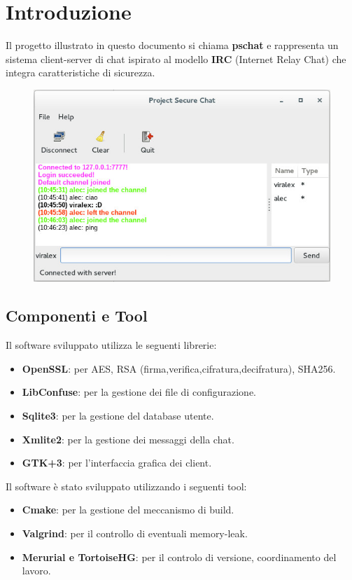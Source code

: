 \documentclass[a4paper,titlepage]{article}
\begin{document}
\section{Introduzione}  \thispagestyle{plain}
Il progetto illustrato in questo documento si chiama \textbf{pschat} e rappresenta un sistema client-server di chat ispirato al modello \textbf{IRC} (Internet Relay Chat) che integra caratteristiche di sicurezza.\\
\begin{figure}[H]
  \centering \includegraphics[scale=1.0]{img/psc_orig.jpg}
\end{figure}
\subsection{Componenti e Tool}
Il software sviluppato utilizza le seguenti librerie:
\begin{itemize}
\item \textbf{OpenSSL}: per AES, RSA (firma,verifica,cifratura,decifratura), SHA256.
\item \textbf{LibConfuse}: per la gestione dei file di configurazione.
\item \textbf{Sqlite3}: per la gestione del database utente.
\item \textbf{Xmlite2}: per la gestione dei messaggi della chat.
\item \textbf{GTK+3}: per l'interfaccia grafica dei client.
\end{itemize}

Il software è stato sviluppato utilizzando i seguenti tool:
\begin{itemize}
\item \textbf{Cmake}: per la gestione del meccanismo di build.
\item \textbf{Valgrind}: per il controllo di eventuali memory-leak.
\item \textbf{Merurial e TortoiseHG}: per il controlo di versione, coordinamento del lavoro.
\end{itemize}
\end{document}
